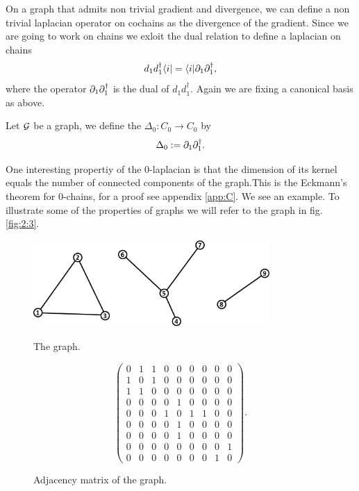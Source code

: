 \documentclass[../2.tex]{subfiles}
\begin{document}
    On a graph that admits non trivial gradient and divergence,
    we can define a non trivial laplacian operator on cochains as the divergence of the gradient.
    Since we are going to work on chains we exloit the dual relation to define a laplacian on chains
    \[d_1d_1^\dagger \langle i | = \langle i | \partial_1 \partial_1^\dagger,\]
    where the operator $\partial_1 \partial_1^\dagger$ is the dual of $d_1d_1^\dagger$.
    Again we are fixing a canonical basis as above.

    \begin{defn}
        Let $\mathcal{G}$ be a graph, we define the  $\Delta_0 : C_0 \to C_0$ by 
        \[ \Delta_0 := \partial_1 \partial^\dagger_1.\]
        \label{lapdef}
    \end{defn}

    One interesting propertiy of the $0$-laplacian is that the dimension of its kernel equals the number of connected components of the graph.This is the Eckmann's theorem for $0$-chains, for a proof see appendix \ref{app:C}.
    We see an example. To illustrate some of the properties of graphs we will refer to the graph in fig. \ref{fig:2:3}. 
    \begin{figure}[H]
        \begin{minipage}{.5\textwidth}
            \centering
            \includegraphics[width=9cm]{sections/2/graphex}
            \caption{The graph.}
            \label{fig:2:3}
        \end{minipage}
        \begin{minipage}{.5\textwidth}
            \centering
            \[\begin{pmatrix}
                0 & 1 & 1 & 0 & 0 & 0 & 0 & 0 & 0 \\
                1 & 0 & 1 & 0 & 0 & 0 & 0 & 0 & 0 \\
                1 & 1 & 0 & 0 & 0 & 0 & 0 & 0 & 0 \\
                0 & 0 & 0 & 0 & 1 & 0 & 0 & 0 & 0 \\
                0 & 0 & 0 & 1 & 0 & 1 & 1 & 0 & 0 \\
                0 & 0 & 0 & 0 & 1 & 0 & 0 & 0 & 0 \\
                0 & 0 & 0 & 0 & 1 & 0 & 0 & 0 & 0 \\
                0 & 0 & 0 & 0 & 0 & 0 & 0 & 0 & 1 \\
                0 & 0 & 0 & 0 & 0 & 0 & 0 & 1 & 0
            \end{pmatrix}. \]
            \caption{Adjacency matrix of the graph.}
            \label{fig:2:4}
        \end{minipage}
    \end{figure}
\end{document}
